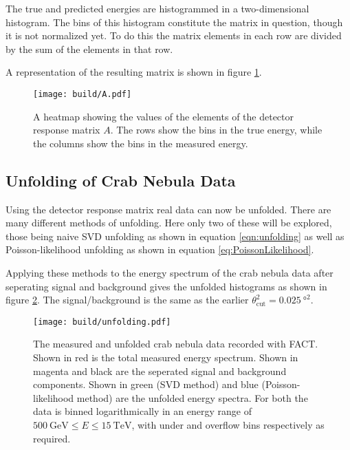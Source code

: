             The true and predicted energies are histogrammed in a two-dimensional histogram.
            The bins of this histogram constitute the matrix in question, though it is not normalized yet.
            To do this the matrix elements in each row are divided by the sum of the elements in that row.

            A representation of the resulting matrix is shown in figure \ref{fig:A}.
            \begin{figure}
                \centering
                \texttt{[image: build/A.pdf]}
                \caption{
                    A heatmap showing the values of the elements of the detector response matrix $A$.
                    The rows show the bins in the true energy, while the columns show the bins in the measured energy.
                }
                \label{fig:A}
            \end{figure}
        \subsection{Unfolding of Crab Nebula Data}
            Using the detector response matrix real data can now be unfolded.
            There are many different methods of unfolding.
            Here only two of these will be explored, those being naive SVD unfolding as shown in equation \eqref{eqn:unfolding} as well as Poisson-likelihood unfolding as shown in equation \eqref{eq:PoissonLikelihood}.

            Applying these methods to the energy spectrum of the crab nebula data after seperating signal and background gives the unfolded histograms as shown in figure \ref{fig:unfolding}.
            The signal/background is the same as the earlier $\theta^2_\text{cut} = \SI{0.025}{\degree\squared}$.
            \begin{figure}
                \centering
                \texttt{[image: build/unfolding.pdf]}
                \caption{
                    The measured and unfolded crab nebula data recorded with FACT.
                    Shown in red is the total measured energy spectrum.
                    Shown in magenta and black are the seperated signal and background components.
                    Shown in green (SVD method) and blue (Poisson-likelihood method) are the unfolded energy spectra.
                    For both the data is binned logarithmically in an energy range of $\SI{500}{\giga\electronvolt} \leq E \leq \SI{15}{\tera\electronvolt}$, with under and overflow bins respectively as required.
                }
                \label{fig:unfolding}
            \end{figure}

